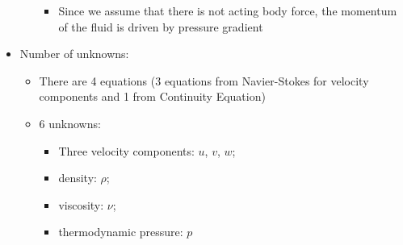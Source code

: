 \begin{itemize}
\begin{itemize}
\begin{itemize}
            \item Since we assume that there is not acting body force, the momentum of the fluid is driven by pressure gradient
        \end{itemize}
    \end{itemize}
    \item Number of unknowns:
    \begin{itemize}
        \item There are 4 equations (3 equations from Navier-Stokes for velocity components and 1 from Continuity Equation)
        \item 6 unknowns: 
        \begin{itemize}
            \item Three velocity components: $u$, $v$, $w$;
            \item density: $\rho$;
            \item viscosity: $\nu$;
            \item thermodynamic pressure: $p$
        \end{itemize}
    \end{itemize}
\end{itemize}

